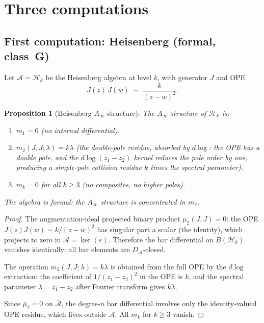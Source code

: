 \documentclass[11pt,reqno]{amsart}
\newtheorem{proposition}[theorem]{Proposition}
\theoremstyle{definition}
\theoremstyle{remark}
\newcommand{\cA}{\mathcal{A}}
\newcommand{\cH}{\mathcal{H}}
\newcommand{\barB}{\overline{B}}
\newcommand{\barA}{\bar{\cA}}
\newcommand{\Ainf}{A_{\infty}}
\numberwithin{equation}{section}
\providecommand{\ClaimStatusProvedHere}{}
\begin{document}
\section{Three computations}
\label{sec:computations}

\subsection{First computation: Heisenberg (formal, class~G)}
\label{subsec:comp-heisenberg}

Let $\cA = \cH_k$ be the Heisenberg algebra at level $k$, with
generator $J$ and OPE
\[
  J(z)\, J(w)
  \;\sim\;
  \frac{k}{(z-w)^2}.
\]

\begin{proposition}[Heisenberg $\Ainf$ structure]
\label{prop:heisenberg-ainf}
\ClaimStatusProvedHere{}
The $\Ainf$ structure of $\cH_k$ is:
\begin{enumerate}[label=(\roman*)]
\item $m_1 = 0$ (no internal differential).
\item $m_2(J, J; \lambda) = k\lambda$ (the double-pole residue,
  absorbed by $d\log$: the OPE has a double pole, and the
  $d\log(z_1 - z_2)$ kernel reduces the pole order by one,
  producing a simple-pole collision residue $k$ times the spectral
  parameter).
\item $m_k = 0$ for all $k \geq 3$ (no composites, no higher
  poles).
\end{enumerate}
The algebra is formal: the $\Ainf$ structure is concentrated in
$m_2$.
\end{proposition}

\begin{proof}
The augmentation-ideal projected binary product
$\bar\mu_2(J, J) = 0$: the OPE $J(z)J(w) \sim k/(z-w)^2$ has
singular part a scalar (the identity), which projects to
zero in $\barA = \ker(\varepsilon)$.  Therefore the bar
differential on $\barB(\cH_k)$ vanishes identically: all bar
elements are $D_\cA$-closed.

The operation $m_2(J,J;\lambda) = k\lambda$ is obtained from
the full OPE by the $d\log$ extraction: the coefficient of
$1/(z_1 - z_2)^2$ in the OPE is $k$, and the spectral
parameter $\lambda = z_1 - z_2$ after Fourier transform gives
$k\lambda$.

Since $\bar\mu_2 = 0$ on $\barA$, the degree-$n$ bar
differential involves only the identity-valued OPE residue,
which lives outside $\barA$.  All $m_k$ for $k \geq 3$ vanish.
\end{proof}
\end{document}
